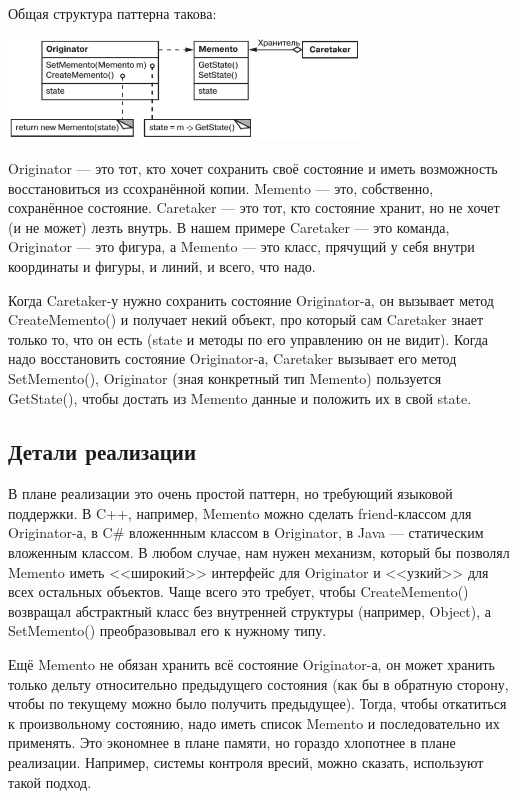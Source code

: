 \documentclass{../text-style}
\begin{document}
Общая структура паттерна такова:

\begin{center}
    \includegraphics[width=0.7\textwidth]{memento.png}
\end{center}

Originator --- это тот, кто хочет сохранить своё состояние и иметь возможность восстановиться из ссохранённой копии. Memento --- это, собственно, сохранённое состояние. Caretaker --- это тот, кто состояние хранит, но не хочет (и не может) лезть внутрь. В нашем примере Caretaker --- это команда, Originator --- это фигура, а Memento --- это класс, прячущий у себя внутри координаты и фигуры, и линий, и всего, что надо.

Когда Caretaker-у нужно сохранить состояние Originator-а, он вызывает метод CreateMemento() и получает некий объект, про который сам Caretaker знает только то, что он есть (state и методы по его управлению он не видит). Когда надо восстановить состояние Originator-а, Caretaker вызывает его метод SetMemento(), Originator (зная конкретный тип Memento) пользуется GetState(), чтобы достать из Memento данные и положить их в свой state.

\subsection{Детали реализации}

В плане реализации это очень простой паттерн, но требующий языковой поддержки. В C++, например, Memento можно сделать friend-классом для Originator-а, в C\# вложеннным классом в Originator, в Java --- статическим вложенным классом. В любом случае, нам нужен механизм, который бы позволял Memento иметь <<широкий>> интерфейс для Originator и <<узкий>> для всех остальных объектов. Чаще всего это требует, чтобы CreateMemento() возвращал абстрактный класс без внутренней структуры (например, Object), а SetMemento() преобразовывал его к нужному типу.

Ещё Memento не обязан хранить всё состояние Originator-а, он может хранить только дельту относительно предыдущего состояния (как бы в обратную сторону, чтобы по текущему можно было получить предыдущее). Тогда, чтобы откатиться к произвольному состоянию, надо иметь список Memento и последовательно их применять. Это экономнее в плане памяти, но гораздо хлопотнее в плане реализации. Например, системы контроля вресий, можно сказать, используют такой подход.
\end{document}
